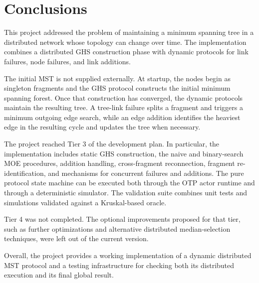 \chapter{Conclusions}

This project addressed the problem of maintaining a minimum spanning tree in a distributed
network whose topology can change over time. The implementation combines a distributed GHS
construction phase with dynamic protocols for link failures, node failures, and link
additions.

The initial MST is not supplied externally. At startup, the nodes begin as singleton
fragments and the GHS protocol constructs the initial minimum spanning forest. Once that
construction has converged, the dynamic protocols maintain the resulting tree. A tree-link
failure splits a fragment and triggers a minimum outgoing edge search, while an edge
addition identifies the heaviest edge in the resulting cycle and updates the tree when
necessary.

The project reached Tier 3 of the development plan. In particular, the implementation
includes static GHS construction, the naive and binary-search MOE procedures, addition
handling, cross-fragment reconnection, fragment re-identification, and mechanisms for
concurrent failures and additions. The pure protocol state machine can be executed both
through the OTP actor runtime and through a deterministic simulator. The validation suite
combines unit tests and simulations validated against a Kruskal-based oracle.

Tier 4 was not completed. The optional improvements proposed for that tier, such as
further optimizations and alternative distributed median-selection techniques, were left %
out of the current version.

Overall, the project provides a working implementation of a dynamic distributed MST
protocol and a testing infrastructure for checking both its distributed execution and its
final global result.
